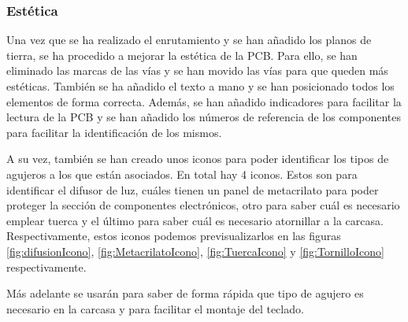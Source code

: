 \subsubsection{Estética}
Una vez que se ha realizado el enrutamiento y se han añadido los planos de tierra, se ha procedido a mejorar la estética de la \gls{PCB}. Para ello, se han eliminado las marcas de las vías y se han movido las vías para que queden más estéticas. También se ha añadido el texto a mano y se han posicionado todos los elementos de forma correcta. Además, se han añadido indicadores para facilitar la lectura de la \gls{PCB} y se han añadido los números de referencia de los componentes para facilitar la identificación de los mismos.

A su vez, también se han creado unos iconos para poder identificar los tipos de agujeros a los que están asociados. En total hay 4 iconos. Estos son para identificar el difusor de luz, cuáles tienen un panel de metacrilato para poder proteger la sección de componentes electrónicos, otro para saber cuál es necesario emplear tuerca y el último para saber cuál es necesario atornillar a la carcasa. Respectivamente, estos iconos podemos previsualizarlos en las figuras \ref{fig:difusionIcono}, \ref{fig:MetacrilatoIcono}, \ref{fig:TuercaIcono} y \ref{fig:TornilloIcono} respectivamente.

Más adelante se usarán para saber de forma rápida que tipo de agujero es necesario en la carcasa y para facilitar el montaje del teclado.


